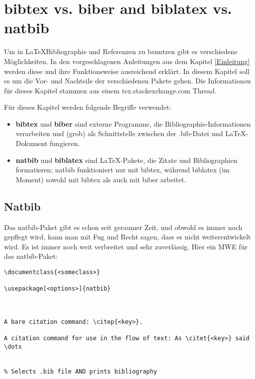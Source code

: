 \chapter{bibtex vs. biber and biblatex vs. natbib}
\label{bib}

Um in \LaTeX Bibliographie und Referenzen zu benutzen gibt es verschiedene Möglichkeiten. In den vorgeschlagenen Anleitungen aus dem Kapitel \ref{Einleitung} werden diese und ihre Funktionsweise ausreichend erklärt. In diesem Kapitel soll es um die Vor- und Nachteile der verschiedenen Pakete gehen. Die Informationen für dieses Kapitel stammen aus einem tex.stackexchange.com Thread.\autocite{bibvsvbib}

Für dieses Kapitel werden folgende Begriffe verwendet:

\begin{itemize}
	\item \textbf{bibtex} und \textbf{biber} sind externe Programme, die Bibliographie-Informationen verarbeiten und (grob) als Schnittstelle zwischen der .bib-Datei und LaTeX-Dokument fungieren.
	\item \textbf{natbib} und \textbf{biblatex} sind LaTeX-Pakete, die Zitate und Bibliographien formatieren; natbib funktioniert nur mit bibtex, während biblatex (im Moment) sowohl mit bibtex als auch mit biber arbeitet.
\end{itemize}


\section{Natbib}
Das natbib-Paket gibt es schon seit geraumer Zeit, und obwohl es immer noch gepflegt wird, kann man mit Fug und Recht sagen, dass es nicht weiterentwickelt wird. Es ist immer noch weit verbreitet und sehr zuverlässig. Hier ein MWE für das natbib-Paket:

\begin{lstlisting}[style=LaTeX]
\documentclass{<someclass>}

\usepackage[<options>]{natbib}



A bare citation command: \citep{<key>}.

A citation command for use in the flow of text: As \citet{<key>} said \dots


% Selects .bib file AND prints bibliography


\end{lstlisting}

